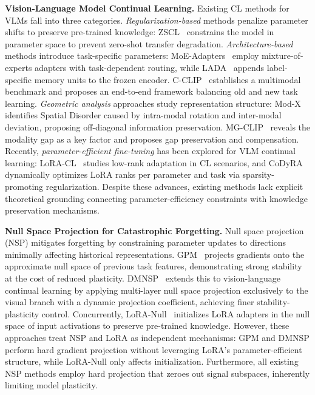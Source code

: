 \documentclass{article}
\begin{document}
\textbf{Vision-Language Model Continual Learning.}
Existing CL methods for VLMs fall into three categories. \textit{Regularization-based} methods penalize parameter shifts to preserve pre-trained knowledge: ZSCL~\cite{zheng2023zscl} constrains the model in parameter space to prevent zero-shot transfer degradation. \textit{Architecture-based} methods introduce task-specific parameters: MoE-Adapters~\cite{yu2024moe} employ mixture-of-experts adapters with task-dependent routing, while LADA~\cite{luo2025lada} appends label-specific memory units to the frozen encoder. C-CLIP~\cite{liu2025cclip} establishes a multimodal benchmark and proposes an end-to-end framework balancing old and new task learning. \textit{Geometric analysis} approaches study representation structure: Mod-X~\cite{ni2023modx} identifies Spatial Disorder caused by intra-modal rotation and inter-modal deviation, proposing off-diagonal information preservation. MG-CLIP~\cite{huang2025mgclip} reveals the modality gap as a key factor and proposes gap preservation and compensation. Recently, \textit{parameter-efficient fine-tuning} has been explored for VLM continual learning: LoRA-CL~\cite{wang2024lora} studies low-rank adaptation in CL scenarios, and CoDyRA~\cite{lu2026codyra} dynamically optimizes LoRA ranks per parameter and task via sparsity-promoting regularization. Despite these advances, existing methods lack explicit theoretical grounding connecting parameter-efficiency constraints with knowledge preservation mechanisms.

\textbf{Null Space Projection for Catastrophic Forgetting.}
Null space projection (NSP) mitigates forgetting by constraining parameter updates to directions minimally affecting historical representations. GPM~\cite{saha2021gradient} projects gradients onto the approximate null space of previous task features, demonstrating strong stability at the cost of reduced plasticity. DMNSP~\cite{kang2025dynamic} extends this to vision-language continual learning by applying multi-layer null space projection exclusively to the visual branch with a dynamic projection coefficient, achieving finer stability-plasticity control. Concurrently, LoRA-Null~\cite{tang2026lora} initializes LoRA adapters in the null space of input activations to preserve pre-trained knowledge. However, these approaches treat NSP and LoRA as independent mechanisms: GPM and DMNSP perform hard gradient projection without leveraging LoRA's parameter-efficient structure, while LoRA-Null only affects initialization. Furthermore, all existing NSP methods employ hard projection that zeroes out signal subspaces, inherently limiting model plasticity.
\end{document}
